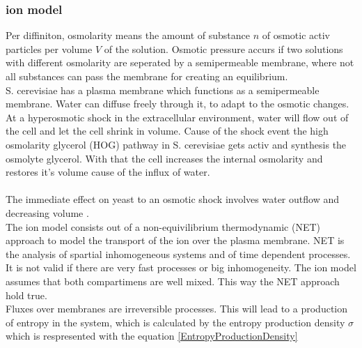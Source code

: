 \subsubsection{ion model}
Per diffiniton, osmolarity means the amount of substance $n$ of osmotic activ particles per volume $V$ of the solution. Osmotic pressure accurs if two solutions with different osmolarity are seperated by a semipermeable membrane, where not all substances can pass the membrane for creating an equilibrium.\\
S. cerevisiae has a plasma membrane which functions as a semipermeable membrane. Water can diffuse freely through it, to adapt to the osmotic changes. At a hyperosmotic shock in the extracellular environment, water will flow out of the cell and let the cell shrink in volume. Cause of the shock event the high osmolarity glycerol (HOG) pathway in S. cerevisiae gets activ and synthesis the osmolyte glycerol. With that the cell increases the internal osmolarity and restores it’s volume cause of the influx of water.\\\\
The immediate effect on yeast to an osmotic shock involves water outflow and decreasing volume \cite{ASimpleMathematicalModel}.\\
The ion model consists out of a non-equivilibrium thermodynamic (NET) approach to model the transport of the ion over the plasma membrane. NET is the analysis of spartial inhomogeneous systems and of time dependent processes. It is not valid if there are very fast processes or big inhomogeneity. The ion model assumes that both compartimens are well mixed. This way the NET approach hold true. \\
Fluxes over membranes are irreversible processes. This will lead to a production of entropy in the system, which is calculated by the entropy production density $\sigma$ which is respresented with the equation \ref{EntropyProductionDensity}

